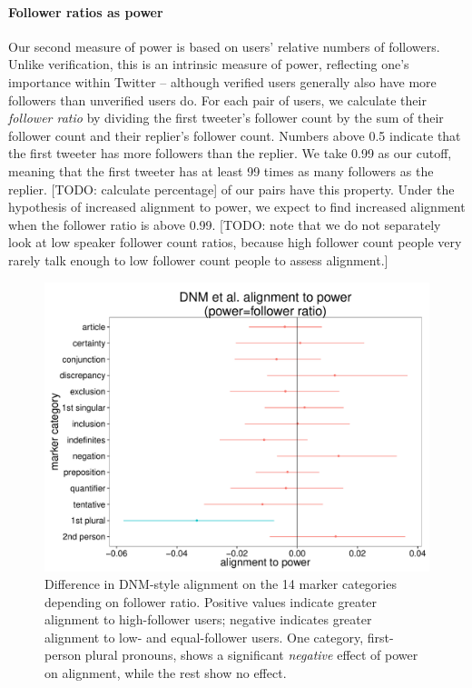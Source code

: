 \documentclass{acm_proc_article-sp}
\begin{document}
\paragraph{Follower ratios as power} Our second measure of power is based on users' relative numbers of followers.  Unlike verification, this is an intrinsic measure of power, reflecting one's importance within Twitter -- although verified users generally also have more followers than unverified users do. For each pair of users, we calculate their \textit{follower ratio} by dividing the first tweeter's follower count by the sum of their follower count and their replier's follower count.  Numbers above 0.5 indicate that the first tweeter has more followers than the replier.  We take 0.99 as our cutoff, meaning that the first tweeter has at least 99 times as many followers as the replier.  [TODO: calculate percentage] of our pairs have this property.  Under the hypothesis of increased alignment to power, we expect to find increased alignment when the follower ratio is above 0.99. [TODO: note that we do not separately look at low speaker follower count ratios, because high follower count people very rarely talk enough to low follower count people to assess alignment.]

\begin{figure}[t]
\centering
\includegraphics[width=.9\columnwidth]{graphics/www2016_dnmpowerdiff_fratio.pdf}
\caption{Difference in DNM-style alignment on the 14 marker categories depending on follower ratio. Positive values indicate greater alignment to high-follower users; negative indicates greater alignment to low- and equal-follower users. One category, first-person plural pronouns, shows a significant \textit{negative} effect of power on alignment, while the rest show no effect.}\label{fig:dnm-fratio}
\end{figure}
\end{document}
